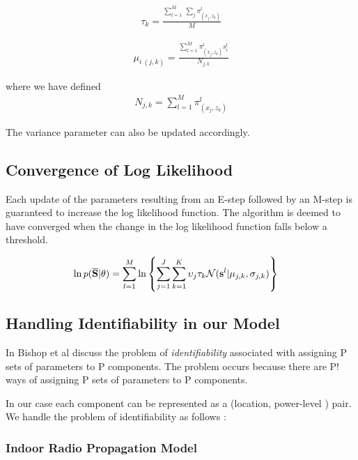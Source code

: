 \documentclass{Localization-PaperWriteupDraft}
\begin{document}
\begin{align}
\tau_{k} = \frac { \sum_{l=1}^{M} \ \sum_{j} \pi_{({x_{j}}, {z_{k}})}^{l}} {M}
\end{align}

\begin{align}
\mu_{i \ (j,k)} = \frac  { \sum_{l=1}^{M} \pi_{({x_{j}}, {z_{k}})}^{l} s_{i}^{l}} {N_{j,k}}
\end{align}

where we have defined 
\begin{align}
{N_{j,k}} = \sum_{l=1}^{M} \pi_{({x_{j}}, {z_{k}})}^{l}
\end{align}


The variance parameter can also be updated accordingly.

\subsection{Convergence of Log Likelihood}
\label{subsec:convergenceofloglikelihood}

Each update of the parameters resulting from an E-step followed by an
M-step is guaranteed to increase the log likelihood function. The algorithm is deemed to have converged when the change in the log likelihood function falls below a threshold.

\begin{align}
\ln p({\bf \overline{S}} | {\bf \theta}) &= \sum_{l=1}^{M} \ln \left\{
\sum_{j=1}^J \sum_{k=1}^K \upsilon_{j} \tau_{k} \mathcal N ({{\bf {s}}^{l}} | {{\bf {\mu}}_{j,k}}, {{\bf \sigma}_{j,k}})\right\} 
\end{align}

\subsection{Handling Identifiability in our Model}
\label{subsec:handlingidentifiabilityinourmodel}

In \cite{Bishop:2006:PRM:1162264} Bishop et al discuss the problem of {\it
identifiability} associated with assigning P sets of parameters to P
components. The problem occurs because there are P! ways of assigning P
sets of parameters to P components. 

In our case each component can be represented as a (location,
power-level ) pair. We handle the problem of identifiability as follows :

\subsubsection{Indoor Radio Propagation Model}
\label{subsubsec:indoorradiopropagationmodel}
\end{document}
